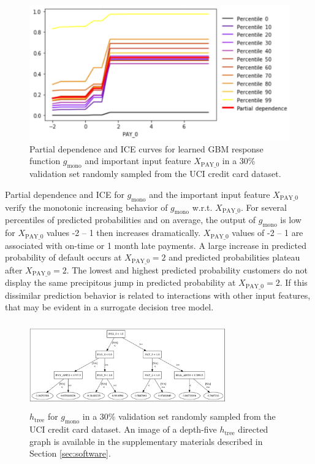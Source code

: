\documentclass[sigconf, review]{acmart}
\begin{document}
\begin{figure}[htb]
	\begin{center}
		\includegraphics[scale=0.45]{img/figure_8-eps-converted-to.pdf}
		\caption{Partial dependence and ICE curves for learned GBM response function $g_{\text{mono}}$ and important input feature $X_{\text{PAY\_0}}$ in a 30\% validation set randomly sampled from the UCI credit card dataset.}
		\label{fig:cc_pdp_ice}
	\end{center}
\end{figure}

Partial dependence and ICE for $g_{\text{mono}}$ and the important input feature $X_{\text{PAY\_0}}$ verify the monotonic increasing behavior of $g_{\text{mono}}$ w.r.t. $X_{\text{PAY\_0}}$. For several percentiles of predicted probabilities and on average, the output of $g_{\text{mono}}$ is low for $X_{\text{PAY\_0}}$ values -2 -- 1 then increases dramatically. $X_{\text{PAY\_0}}$ values of -2 -- 1 are associated with on-time or 1 month late payments. A large increase in predicted probability of default occurs at $X_{\text{PAY\_0}} = 2$ and predicted probabilities plateau after $X_{\text{PAY\_0}} = 2$. The lowest and highest predicted probability customers do not display the same precipitous jump in predicted probability at $X_{\text{PAY\_0}} = 2$. If this dissimilar prediction behavior is related to interactions with other input features, that may be evident in a surrogate decision tree model.

\begin{figure}[htb]
	\begin{center}
		\includegraphics[height=105pt, width=240pt]{img/figure_9.eps}
		\caption{$h_{\text{tree}}$ for $g_{\text{mono}}$ in a 30\% validation set randomly sampled from the UCI credit card dataset. An image of a depth-five $h_{\text{tree}}$ directed graph is available in the supplementary materials described in Section \ref{sec:software}.}
		\label{fig:cc_dt_surrogate}
	\end{center}
\end{figure}
\end{document}
